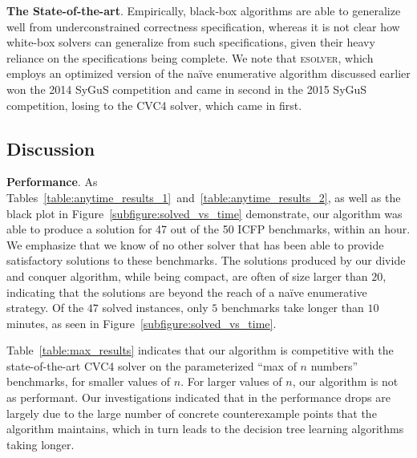 \documentclass{llncs}
\newcommand{\sygus}{{\sffamily\fontsize{8.5}{10}\selectfont
    SyGuS}\xspace}
\newcommand{\dcsolve}{{\sffamily\fontsize{8.5}{10}\selectfont
    DCSolve}\xspace}
\renewcommand{\paragraph}[1]{\par\noindent\textbf{#1}.}
\newcommand{\esolver}{\textsc{esolver}\xspace}
\begin{document}
\paragraph{The State-of-the-art}
Empirically, black-box algorithms are able to generalize well from
underconstrained correctness specification, whereas it is not clear
how white-box solvers can generalize from such specifications, given
their heavy reliance on the specifications being complete.
We note that \esolver, which employs an optimized
version of the na\"ive enumerative algorithm discussed earlier won the
2014 \sygus competition and came in second in the 2015 \sygus
competition, losing to the CVC4 solver, which came in first.

\subsection{Discussion}

\paragraph{Performance}
As
Tables~\ref{table:anytime_results_1}~and~\ref{table:anytime_results_2},
as well as the black plot in Figure~\ref{subfigure:solved_vs_time}
demonstrate, our algorithm was able to produce a solution for 47 out
of the 50 ICFP benchmarks, within an hour.
We emphasize that we know
of no other solver that has been able to provide satisfactory
solutions to these benchmarks.  The solutions produced by our divide
and conquer algorithm, while being compact, are often of size larger
than $20$, indicating that the solutions are beyond the reach of a
na\"ive enumerative strategy.
Of the $47$ solved instances, only $5$ benchmarks take longer than $10$
minutes, as seen in Figure~\ref{subfigure:solved_vs_time}.

Table~\ref{table:max_results} indicates that our algorithm is competitive
with the state-of-the-art CVC4 solver on the parameterized ``max of
$n$ numbers'' benchmarks, for smaller values of $n$. For larger
values of $n$, our algorithm is not as performant. Our investigations
indicated that in the performance drops are largely due to the large
number of concrete counterexample points that the algorithm maintains,
which in turn leads to the decision tree learning algorithms taking
longer.
\end{document}

